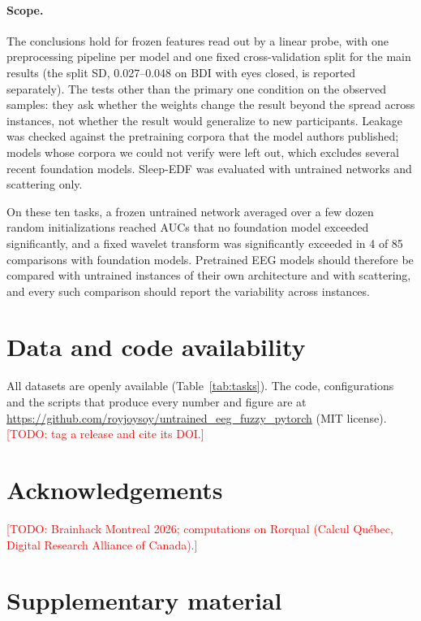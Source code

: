 \documentclass[11pt]{article}
\newcommand{\todo}[1]{\textcolor{red}{[TODO: #1]}}
\begin{document}
\paragraph{Scope.} The conclusions hold for frozen features read out by a linear probe, with one
preprocessing pipeline per model and one fixed cross-validation split for the main results (the
split SD, 0.027--0.048 on BDI with eyes closed, is reported separately). The tests other than the
primary one condition on the observed samples: they ask whether the weights change the result beyond
the spread across instances, not whether the result would generalize to new participants. Leakage
was checked against the pretraining corpora that the model authors published; models whose corpora we
could not verify were left out, which excludes several recent foundation models. Sleep-EDF was
evaluated with untrained networks and scattering only.

On these ten tasks, a frozen untrained network averaged over a few dozen random initializations
reached AUCs that no foundation model exceeded significantly, and a fixed wavelet transform was
significantly exceeded in 4 of 85 comparisons with foundation models. Pretrained
EEG models should therefore be compared with untrained instances of their own architecture and with
scattering, and every such comparison should report the variability across instances.

\section*{Data and code availability}
All datasets are openly available (Table~\ref{tab:tasks}). The code, configurations and the
scripts that produce every number and figure are at
\url{https://github.com/royjoysoy/untrained_eeg_fuzzy_pytorch} (MIT license).
\todo{tag a release and cite its DOI.}

\section*{Acknowledgements}
\todo{Brainhack Montreal 2026; computations on Rorqual (Calcul Qu\'ebec, Digital Research
Alliance of Canada).}




\clearpage
\appendix
\renewcommand{\thetable}{S\arabic{table}}
\setcounter{table}{0}
\section*{Supplementary material}
\end{document}
